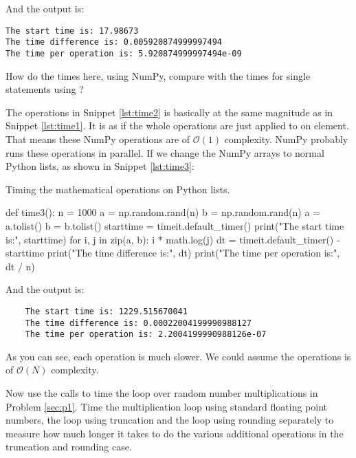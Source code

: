 And the output is:

\begin{verbatim}
The start time is: 17.98673
The time difference is: 0.005920874999997494
The time per operation is: 5.920874999997494e-09
\end{verbatim}

\Question How do the times here, using NumPy, compare with the times for single
statements using ?

\Answer The operations in Snippet \ref{lst:time2} is basically at the same magnitude as
in Snippet \ref{lst:time1}. It is as if the whole operations are just applied to
on element. That means these NumPy operations are of \(\mathcal{O}(1)\) complexity.
NumPy probably runs these operations in parallel.
If we change the NumPy arrays to normal Python lists, as shown in Snippet \ref{lst:time3}:

\begin{algorithm}[H]
    \caption{Timing the mathematical operations on Python lists.}
    \label{lst:time3}
    \begin{pythoncode}
        def time3():
            n = 1000
            a = np.random.rand(n)
            b = np.random.rand(n)
            a = a.tolist()
            b = b.tolist()
            starttime = timeit.default_timer()
            print("The start time is:", starttime)
            for i, j in zip(a, b):
                i * math.log(j)
            dt = timeit.default_timer() - starttime
            print("The time difference is:", dt)
            print("The time per operation is:", dt / n)
        \end{pythoncode}
\end{algorithm}

And the output is:

\begin{verbatim}
    The start time is: 1229.515670041
    The time difference is: 0.00022004199990988127
    The time per operation is: 2.2004199990988126e-07
\end{verbatim}

As you can see, each operation is much slower. We could assume the operations is
of \(\mathcal{O}(N)\) complexity.

\Question Now use the  calls to time the loop over random number
multiplications in Problem \ref{sec:p1}. Time the multiplication loop using standard
floating point numbers, the loop using truncation and the loop using rounding separately to
measure how much longer it takes to do the various additional operations in the truncation
and rounding case.

